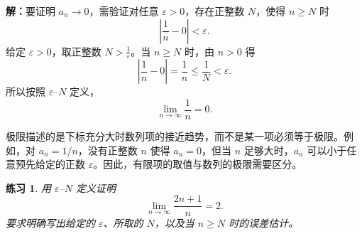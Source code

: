 \documentclass[UTF8,fontset=fandol,11pt]{ctexart}
\newtheorem{exercise}[definition]{练习}
\begin{document}
\par\noindent\textbf{解：}要证明 $a_n\to0$，需验证对任意 $\varepsilon>0$，存在正整数 $N$，使得 $n\geq N$ 时
\[
\left|\frac{1}{n}-0\right|<\varepsilon.
\]
给定 $\varepsilon>0$，取正整数 $N>\frac{1}{\varepsilon}$。当 $n\geq N$ 时，由 $n>0$ 得
\[
\left|\frac{1}{n}-0\right|=\frac{1}{n}\leq\frac{1}{N}<\varepsilon.
\]
所以按照 $\varepsilon$--$N$ 定义，
\[
\lim_{n\to\infty}\frac{1}{n}=0.
\]\par
极限描述的是下标充分大时数列项的接近趋势，而不是某一项必须等于极限。例如，对 $a_n=1/n$，没有正整数 $n$ 使得 $a_n=0$，但当 $n$ 足够大时，$a_n$ 可以小于任意预先给定的正数 $\varepsilon$。因此，有限项的取值与数列的极限需要区分。\par
\begin{exercise}
\label{mathagent:exercise:41706b9e371cbf8283a4f1192e660b4426644ffb8f650af52f47cef5491b1ca0}
用 $\varepsilon$--$N$ 定义证明
\[
\lim_{n\to\infty}\frac{2n+1}{n}=2.
\]
要求明确写出给定的 $\varepsilon$、所取的 $N$，以及当 $n\geq N$ 时的误差估计。
\end{exercise}
\end{document}
